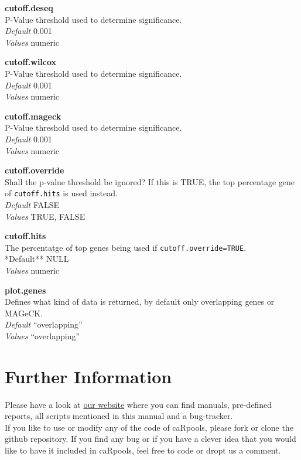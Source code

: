 \documentclass[]{article}
\begin{document}
\textbf{cutoff.deseq}\\
P-Value threshold used to determine significance.\\
\emph{Default} 0.001\\
\emph{Values} numeric

\textbf{cutoff.wilcox}\\
P-Value threshold used to determine significance.\\
\emph{Default} 0.001\\
\emph{Values} numeric

\textbf{cutoff.mageck}\\
P-Value threshold used to determine significance.\\
\emph{Default} 0.001\\
\emph{Values} numeric

\textbf{cutoff.override}\\
Shall the p-value threshold be ignored? If this is TRUE, the top
percentage gene of \texttt{cutoff.hits} is used instead.\\
\emph{Default} FALSE\\
\emph{Values} TRUE, FALSE

\textbf{cutoff.hits}\\
The percentatge of top genes being used if
\texttt{cutoff.override=TRUE}.\\
*Default** NULL\\
\emph{Values} numeric

\textbf{plot.genes}\\
Defines what kind of data is returned, by default only overlapping genes
or MAGeCK.\\
\emph{Default} ``overlapping''\\
\emph{Values} ``overlapping''

\section{Further Information}\label{further-information}

Please have a look at \href{http://www.crispr-analyzer.de}{our website}
where you can find manuals, pre-defined reports, all scripts mentioned
in this manual and a bug-tracker.\\
If you like to use or modify any of the code of caRpools, please fork or
clone the github repository. If you find any bug or if you have a clever
idea that you would like to have it included in caRpools, feel free to
code or dropt us a comment.
\end{document}
